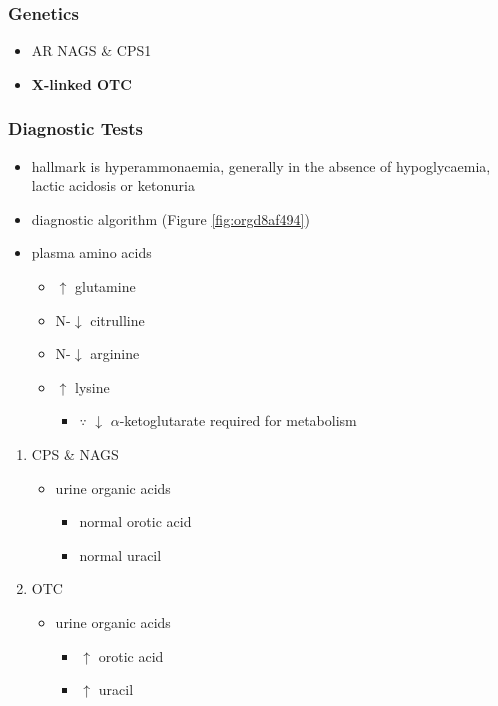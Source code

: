 \documentclass[12pt]{scrartcl}
\begin{document}
\begin{center}
\begin{center}
\subsubsection{Genetics}
\label{sec:org2ba3fa8}
\begin{itemize}
\item AR NAGS \& CPS1
\item \textbf{X-linked OTC}
\end{itemize}

\subsubsection{Diagnostic Tests}
\label{sec:org3998b48}
\begin{itemize}
\item hallmark is hyperammonaemia, generally in the absence of
hypoglycaemia, lactic acidosis or ketonuria
\item diagnostic algorithm (Figure \ref{fig:orgd8af494})
\item plasma amino acids
\begin{itemize}
\item \(\uparrow\) glutamine
\item N-\(\downarrow\) citrulline
\item N-\(\downarrow\) arginine
\item \(\uparrow\) lysine
\begin{itemize}
\item \(\because\) \(\downarrow\) \(\alpha\)-ketoglutarate required for metabolism
\end{itemize}
\end{itemize}
\end{itemize}
\begin{enumerate}
\item CPS \& NAGS
\label{sec:org1bcba84}
\begin{itemize}
\item urine organic acids
\begin{itemize}
\item normal orotic acid
\item normal uracil
\end{itemize}
\end{itemize}
\item OTC
\label{sec:org3983264}
\begin{itemize}
\item urine organic acids
\begin{itemize}
\item \(\uparrow\) orotic acid
\item \(\uparrow\) uracil
\end{itemize}
\end{itemize}
\end{enumerate}



\end{center}
\end{center}
\end{document}
